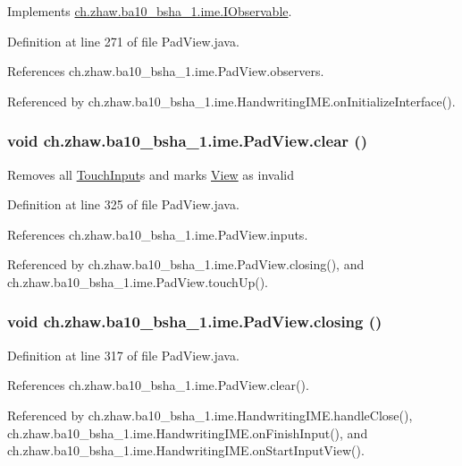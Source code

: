 Implements \hyperlink{interfacech_1_1zhaw_1_1ba10__bsha__1_1_1ime_1_1IObservable_ab05b466951c1b4c9c05644c27cf3fd9f}{ch.zhaw.ba10\_\-bsha\_\-1.ime.IObservable}.

Definition at line 271 of file PadView.java.

References ch.zhaw.ba10\_\-bsha\_\-1.ime.PadView.observers.

Referenced by ch.zhaw.ba10\_\-bsha\_\-1.ime.HandwritingIME.onInitializeInterface().\hypertarget{classch_1_1zhaw_1_1ba10__bsha__1_1_1ime_1_1PadView_a5bfac21895a5740fef99268846f223ef}{
\subsubsection[{clear}]{\setlength{\rightskip}{0pt plus 5cm}void ch.zhaw.ba10\_\-bsha\_\-1.ime.PadView.clear ()}}
\label{classch_1_1zhaw_1_1ba10__bsha__1_1_1ime_1_1PadView_a5bfac21895a5740fef99268846f223ef}
Removes all \hyperlink{classch_1_1zhaw_1_1ba10__bsha__1_1_1ime_1_1TouchInput}{TouchInput}s and marks \hyperlink{}{View} as invalid 

Definition at line 325 of file PadView.java.

References ch.zhaw.ba10\_\-bsha\_\-1.ime.PadView.inputs.

Referenced by ch.zhaw.ba10\_\-bsha\_\-1.ime.PadView.closing(), and ch.zhaw.ba10\_\-bsha\_\-1.ime.PadView.touchUp().\hypertarget{classch_1_1zhaw_1_1ba10__bsha__1_1_1ime_1_1PadView_a4e5d62bdc50d1efae84f0cde40beeb51}{
\subsubsection[{closing}]{\setlength{\rightskip}{0pt plus 5cm}void ch.zhaw.ba10\_\-bsha\_\-1.ime.PadView.closing ()}}
\label{classch_1_1zhaw_1_1ba10__bsha__1_1_1ime_1_1PadView_a4e5d62bdc50d1efae84f0cde40beeb51}


Definition at line 317 of file PadView.java.

References ch.zhaw.ba10\_\-bsha\_\-1.ime.PadView.clear().

Referenced by ch.zhaw.ba10\_\-bsha\_\-1.ime.HandwritingIME.handleClose(), ch.zhaw.ba10\_\-bsha\_\-1.ime.HandwritingIME.onFinishInput(), and ch.zhaw.ba10\_\-bsha\_\-1.ime.HandwritingIME.onStartInputView().

